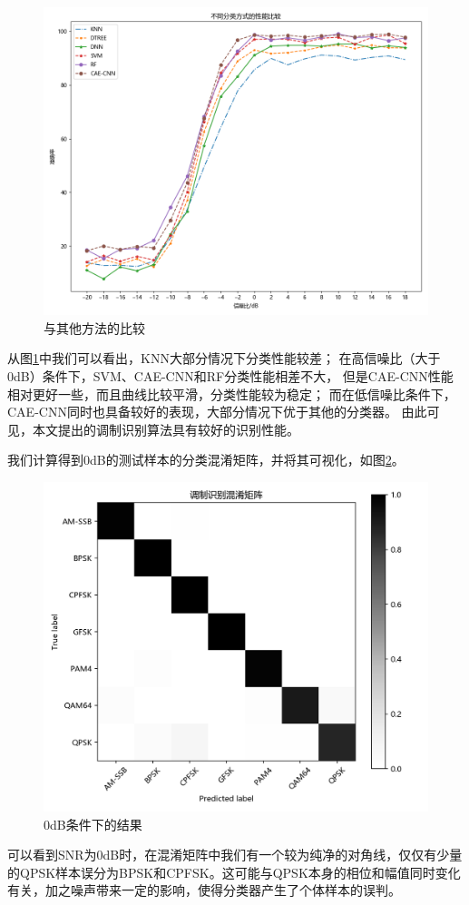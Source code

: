 \begin{figure}[!h]
	\centering
	\includegraphics[scale=0.5]{figures/chapter_3/fig_3_11}
	\caption{与其他方法的比较}	\label{sec:fig_3_11}
\end{figure}

从图\ref{sec:fig_3_11}中我们可以看出，KNN大部分情况下分类性能较差；
在高信噪比（大于0dB）条件下，SVM、CAE-CNN和RF分类性能相差不大，
但是CAE-CNN性能相对更好一些，而且曲线比较平滑，分类性能较为稳定；
而在低信噪比条件下，CAE-CNN同时也具备较好的表现，大部分情况下优于其他的分类器。
由此可见，本文提出的调制识别算法具有较好的识别性能。\par

我们计算得到0dB的测试样本的分类混淆矩阵，并将其可视化，如图\ref{sec:fig_3_10}。\par
\begin{figure}[!h]
	\centering
	\includegraphics[scale=0.7]{figures/chapter_3/fig_3_10}
	\caption{0dB条件下的结果}	\label{sec:fig_3_10}
\end{figure}
可以看到SNR为0dB时，在混淆矩阵中我们有一个较为纯净的对角线，仅仅有少量的QPSK样本误分为BPSK和CPFSK。这可能与QPSK本身的相位和幅值同时变化有关，加之噪声带来一定的影响，使得分类器产生了个体样本的误判。\par

